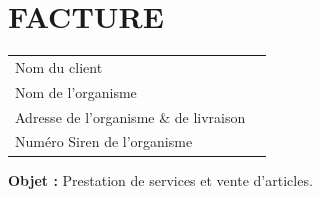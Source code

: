 \documentclass[11pt,a4paper]{article}
\begin{document}
\begin{minipage}[t]{0.5\textwidth}
    \hspace*{0pt}\vspace*{\fill}
    \section*{\LARGE FACTURE}
\end{minipage}\begin{minipage}[t]{0.5\textwidth}
    \begin{framed}
        \begin{tabular}{ll}
            Nom du client                          \\
            Nom de l'organisme                     \\
            Adresse de l'organisme \& de livraison \\
            Numéro Siren de l'organisme            \\
        \end{tabular}
    \end{framed}
    \vspace{0.1cm}
\end{minipage}



\textbf{Objet :} Prestation de services et vente d'articles.

\vspace{0.5cm}
\end{document}
